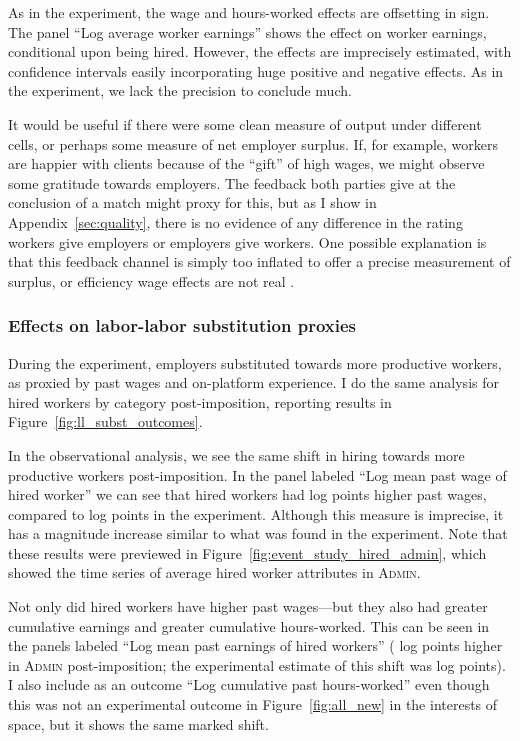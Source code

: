 \documentclass[AER]{AEA}
\newcommand{\admin}{\textsc{Admin}}
\begin{document}
As in the experiment, the wage and hours-worked effects are offsetting in sign.
The panel ``Log average worker earnings'' shows the effect on worker earnings, conditional upon being hired. 
However, the effects are imprecisely estimated, with confidence intervals easily incorporating huge positive and negative effects.
As in the experiment, we lack the precision to conclude much.

It would be useful if there were some clean measure of output under different cells, or perhaps some measure of net employer surplus.
If, for example, workers are happier with clients because of the ``gift'' of high wages, we might observe some gratitude towards employers.
The feedback both parties give at the conclusion of a match might proxy for this, but as I show in Appendix~\ref{sec:quality}, there is no evidence of any difference in the rating workers give employers or employers give workers. 
One possible explanation is that this feedback channel is simply too inflated to offer a precise measurement of surplus, or efficiency wage effects are not real \cite{filippas2022}.

\subsubsection{Effects on labor-labor substitution proxies}
During the experiment, employers substituted towards more productive workers, as proxied by past wages and on-platform experience.
I do the same analysis for hired workers by category post-imposition, reporting results in Figure~\ref{fig:ll_subst_outcomes}.

In the observational analysis, we see the same shift in hiring towards more productive workers post-imposition.
In the panel labeled ``Log mean past wage of hired worker'' we can see that hired workers had  \DIDpastavgwage{} log points higher past wages, compared to \ADMINThreeloghiredpastweffects{} log points in the experiment.
Although this measure is imprecise, it has a magnitude increase similar to what was found in the experiment.
Note that these results were previewed in Figure~\ref{fig:event_study_hired_admin}, which showed the time series of average hired worker attributes in \admin{}.

Not only did hired workers have higher past wages---but they also had greater cumulative earnings and greater cumulative hours-worked.
This can be seen in the panels labeled ``Log mean past earnings of hired workers'' (\DIDcumulativepastearnings{} log points higher in \admin{} post-imposition; the experimental estimate of this shift was \ADMINTwologhiredpastyeffects{} log points).
I also include as an outcome ``Log cumulative past hours-worked'' even though this was not an experimental outcome in Figure~\ref{fig:all_new} in the interests of space, but it shows the same marked shift.
\end{document}
